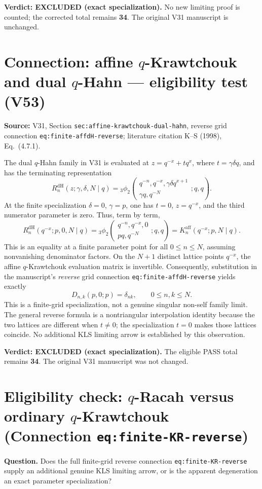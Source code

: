 \documentclass[11pt]{article}
\begin{document}
\noindent\textbf{Verdict: EXCLUDED (exact specialization).}
No new limiting proof is counted; the corrected total remains
\textbf{34}. The original V31 manuscript is unchanged.

\section{Connection: affine $q$-Krawtchouk and dual $q$-Hahn --- eligibility test (V53)}
\noindent\textbf{Source:} V31, Section
\texttt{sec:affine-krawtchouk-dual-hahn}, reverse grid connection
\texttt{eq:finite-affdH-reverse}; literature citation K--S (1998),
Eq.~(4.7.1).

The dual $q$-Hahn family in V31 is evaluated at
$z=q^{-x}+tq^x$, where $t=\gamma\delta q$, and has the
terminating representation
\[
 R_n^{\mathrm{dH}}(z;\gamma,\delta,N\mid q)
 ={}_3\phi_2\!\left(\begin{matrix}
 q^{-n},q^{-x},\gamma\delta q^{x+1}\\
 \gamma q,q^{-N}
 \end{matrix};q,q\right).
\]
At the finite specialization $\delta=0$, $\gamma=p$, one has
$t=0$, $z=q^{-x}$, and the third numerator parameter is zero.
Thus, term by term,
\[
 \boxed{R_n^{\mathrm{dH}}(q^{-x};p,0,N\mid q)
 ={}_3\phi_2\!\left(\begin{matrix}
 q^{-n},q^{-x},0\\pq,q^{-N}
 \end{matrix};q,q\right)
 =K_n^{\mathrm{aff}}(q^{-x};p,N\mid q).}
\]
This is an equality at a finite parameter point for all
$0\le n\le N$, assuming nonvanishing denominator factors.
On the $N+1$ distinct lattice points $q^{-x}$, the affine
$q$-Krawtchouk evaluation matrix is invertible. Consequently,
substitution in the manuscript's \emph{reverse} grid connection
\texttt{eq:finite-affdH-reverse} yields exactly
\[
 D_{n,k}(p,0;p)=\delta_{nk},\qquad 0\le n,k\le N.
\]
This is a finite-grid specialization, not a genuine singular
non-self family limit. The general reverse formula is a
nontriangular interpolation identity because the two lattices
are different when $t\ne0$; the specialization $t=0$ makes
those lattices coincide. No additional KLS limiting arrow is
established by this observation.

\noindent\textbf{Verdict: EXCLUDED (exact specialization).}
The eligible PASS total remains \textbf{34}. The original V31
manuscript was not changed.


\section{Eligibility check: $q$-Racah versus ordinary $q$-Krawtchouk (Connection \texttt{eq:finite-KR-reverse})}
\noindent\textbf{Question.} Does the full finite-grid reverse connection
\texttt{eq:finite-KR-reverse} supply an additional genuine KLS limiting
arrow, or is the apparent degeneration an exact parameter specialization?
\end{document}
